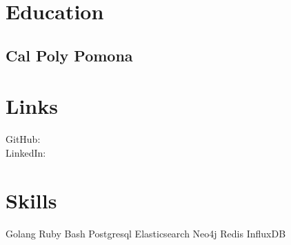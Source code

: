 \documentclass[]{modern}
\begin{document}
%
%

%
%



%
%

\begin{minipage}[t]{0.33\textwidth}


\section{Education}

\subsection{Cal Poly Pomona}
\sectionsep


\section{Links}
GitHub: \href{https://github.com/kylegrantlucas}{} \\
LinkedIn: \href{https://www.linkedin.com/in/kylegrantlucas}{} \\
\sectionsep


\section{Skills}
Golang \textbullet{} Ruby \textbullet{} Bash \textbullet{} Postgresql \textbullet{} Elasticsearch \textbullet{} Neo4j \textbullet{} Redis \textbullet{} InfluxDB


\end{minipage}
\end{document}
